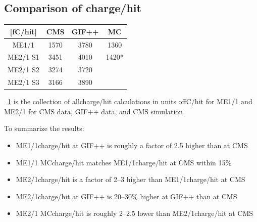 \subsection{Comparison of charge/hit}

\begin{table}
	\centering
	\label{tab:charge_per_hit}
	\begin{tabular}{c|ccc}
	{[}fC/hit{]}                 & CMS                      & GIF++                    & MC                   \\ \hline
	ME1/1                        & 1570                     & 3780                     & 1360                 \\ \hline
	ME2/1 S1                     & 3451                     & 4010                     & 1420*                \\ \hline
	ME2/1 S2                     & 3274                     & 3720                     &                      \\ \hline
	ME2/1 S3                     & 3166                     & 3890                     &                      \\ 
	\end{tabular}
\end{table}

\Tab~\ref{tab:charge_per_hit} is the collection of all\unit{charge/hit} calculations in units of\unit{fC/hit} for ME1/1 and ME2/1 for CMS data, GIF++ data, and CMS simulation. 

To summarize the results: 
\begin{itemize}
	\item ME1/1\unit{charge/hit} at GIF++ is roughly a factor of 2.5 higher than at CMS
	\item ME1/1 MC\unit{charge/hit} matches ME1/1\unit{charge/hit} at CMS within 15\%
	\item ME2/1\unit{charge/hit} is a factor of 2--3 higher than ME1/1\unit{charge/hit} at CMS
	\item ME2/1\unit{charge/hit} at GIF++ is 20--30\% higher at GIF++ than at CMS
	\item ME2/1 MC\unit{charge/hit} is roughly 2--2.5 lower than ME2/1\unit{charge/hit} at CMS
\end{itemize}


